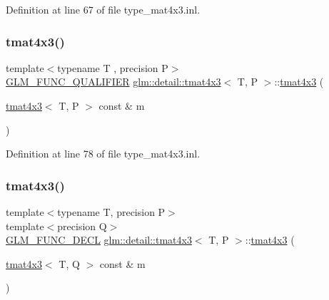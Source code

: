 Definition at line 67 of file type\+\_\+mat4x3.\+inl.

\mbox{\label{structglm_1_1detail_1_1tmat4x3_ae77cc858418c288537a65d74d891bf00}} 
\subsubsection{\texorpdfstring{tmat4x3()}{tmat4x3()}\hspace{0.1cm}{\footnotesize\ttfamily [2/22]}}
{\footnotesize\ttfamily template$<$typename T , precision P$>$ \\
\hyperlink{setup_8hpp_a33fdea6f91c5f834105f7415e2a64407}{G\+L\+M\+\_\+\+F\+U\+N\+C\+\_\+\+Q\+U\+A\+L\+I\+F\+I\+ER} \hyperlink{structglm_1_1detail_1_1tmat4x3}{glm\+::detail\+::tmat4x3}$<$ T, P $>$\+::\hyperlink{structglm_1_1detail_1_1tmat4x3}{tmat4x3} (\begin{DoxyParamCaption}\item[{\hyperlink{structglm_1_1detail_1_1tmat4x3}{tmat4x3}$<$ T, P $>$ const \&}]{m }\end{DoxyParamCaption})}



Definition at line 78 of file type\+\_\+mat4x3.\+inl.

\mbox{\label{structglm_1_1detail_1_1tmat4x3_a5fcf4eb115cbf03560ab19f4673f9b3c}} 
\subsubsection{\texorpdfstring{tmat4x3()}{tmat4x3()}\hspace{0.1cm}{\footnotesize\ttfamily [3/22]}}
{\footnotesize\ttfamily template$<$typename T, precision P$>$ \\
template$<$precision Q$>$ \\
\hyperlink{setup_8hpp_ab2d052de21a70539923e9bcbf6e83a51}{G\+L\+M\+\_\+\+F\+U\+N\+C\+\_\+\+D\+E\+CL} \hyperlink{structglm_1_1detail_1_1tmat4x3}{glm\+::detail\+::tmat4x3}$<$ T, P $>$\+::\hyperlink{structglm_1_1detail_1_1tmat4x3}{tmat4x3} (\begin{DoxyParamCaption}\item[{\hyperlink{structglm_1_1detail_1_1tmat4x3}{tmat4x3}$<$ T, Q $>$ const \&}]{m }\end{DoxyParamCaption})}

